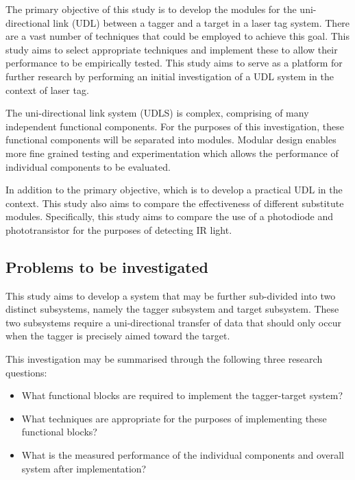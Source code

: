 The primary objective of this study is to develop the modules for the uni-directional link (UDL) between a tagger and a target in a laser tag system. There are a vast number of techniques that could be employed to achieve this goal. This study aims to select appropriate techniques and implement these to allow their performance to be empirically tested. This study aims to serve as a platform for further research by performing an initial investigation of a UDL system in the context of laser tag.

The uni-directional link system (UDLS) is complex, comprising of many independent functional components. For the purposes of this investigation, these functional components will be separated into modules. Modular design enables more fine grained testing and experimentation which allows the performance of individual components to be evaluated.

In addition to the primary objective, which is to develop a practical UDL in the context. This study also aims to compare the effectiveness of different substitute modules. Specifically, this study aims to compare the use of a photodiode and phototransistor for the purposes of detecting IR light.

\subsection{Problems to be investigated}

This study aims to develop a system that may be further sub-divided into two distinct subsystems, namely the tagger subsystem and target subsystem. These two subsystems require a uni-directional transfer of data that should only occur when the tagger is precisely aimed toward the target.

This investigation may be summarised through the following three research questions:

\begin{itemize}
	\item What functional blocks are required to implement the tagger-target system?
	\item What techniques are appropriate for the purposes of implementing these functional blocks?
	\item What is the measured performance of the individual components and overall system after implementation?
%	
\end{itemize}

